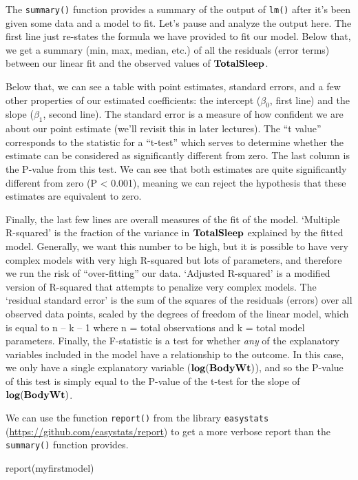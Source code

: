 \documentclass[
]{book}
\newenvironment{Shaded}{\begin{snugshade}}{\end{snugshade}}
\newcommand{\FunctionTok}[1]{\textcolor[rgb]{0.00,0.00,0.00}{#1}}
\newcommand{\NormalTok}[1]{#1}
\begin{document}
The \texttt{summary()} function provides a summary of the output of \texttt{lm()} after it's been given some data and a model to fit. Let's pause and analyze the output here. The first line just re-states the formula we have provided to fit our model. Below that, we get a summary (min, max, median, etc.) of all the residuals (error terms) between our linear fit and the observed values of \(\bf{TotalSleep}\).

Below that, we can see a table with point estimates, standard errors, and a few other properties of our estimated coefficients: the intercept (\(\beta_0\), first line) and the slope (\(\beta_1\), second line). The standard error is a measure of how confident we are about our point estimate (we'll revisit this in later lectures). The ``t value'' corresponds to the statistic for a ``t-test'' which serves to determine whether the estimate can be considered as significantly different from zero. The last column is the P-value from this test. We can see that both estimates are quite significantly different from zero (P \textless{} 0.001), meaning we can reject the hypothesis that these estimates are equivalent to zero.

Finally, the last few lines are overall measures of the fit of the model. `Multiple R-squared' is the fraction of the variance in \(\bf{TotalSleep}\) explained by the fitted model. Generally, we want this number to be high, but it is possible to have very complex models with very high R-squared but lots of parameters, and therefore we run the risk of ``over-fitting'' our data. `Adjusted R-squared' is a modified version of R-squared that attempts to penalize very complex models. The `residual standard error' is the sum of the squares of the residuals (errors) over all observed data points, scaled by the degrees of freedom of the linear model, which is equal to n -- k -- 1 where n = total observations and k = total model parameters. Finally, the F-statistic is a test for whether \emph{any} of the explanatory variables included in the model have a relationship to the outcome. In this case, we only have a single explanatory variable (\(\bf{log(BodyWt)}\)), and so the P-value of this test is simply equal to the P-value of the t-test for the slope of \(\bf{log(BodyWt)}\).

We can use the function \texttt{report()} from the library \texttt{easystats} (\url{https://github.com/easystats/report}) to get a more verbose report than the \texttt{summary()} function provides.

\begin{Shaded}
\begin{Highlighting}[]
\FunctionTok{report}\NormalTok{(myfirstmodel)}
\end{Highlighting}
\end{Shaded}
\end{document}
